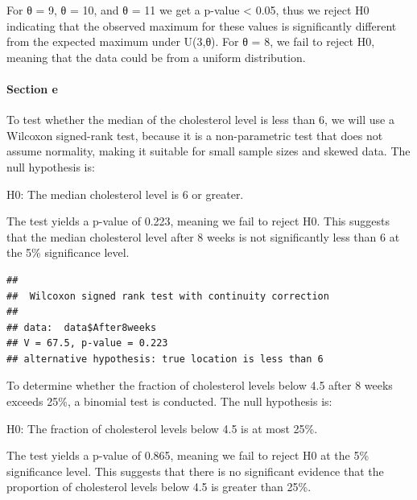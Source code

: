 \documentclass[
  11pt,
]{article}
\newenvironment{Shaded}{\begin{snugshade}}{\end{snugshade}}
\newcommand{\AttributeTok}[1]{\textcolor[rgb]{0.13,0.29,0.53}{#1}}
\newcommand{\ConstantTok}[1]{\textcolor[rgb]{0.56,0.35,0.01}{#1}}
\newcommand{\DecValTok}[1]{\textcolor[rgb]{0.00,0.00,0.81}{#1}}
\newcommand{\FunctionTok}[1]{\textcolor[rgb]{0.13,0.29,0.53}{\textbf{#1}}}
\newcommand{\NormalTok}[1]{#1}
\newcommand{\SpecialCharTok}[1]{\textcolor[rgb]{0.81,0.36,0.00}{\textbf{#1}}}
\newcommand{\StringTok}[1]{\textcolor[rgb]{0.31,0.60,0.02}{#1}}
\begin{document}
For θ = 9, θ = 10, and θ = 11 we get a p-value \textless{} 0.05, thus we
reject H0 indicating that the observed maximum for these values is
significantly different from the expected maximum under U(3,θ). For θ =
8, we fail to reject H0, meaning that the data could be from a uniform
distribution.

\paragraph{Section e}\label{section-e}

To test whether the median of the cholesterol level is less than 6, we
will use a Wilcoxon signed-rank test, because it is a non-parametric
test that does not assume normality, making it suitable for small sample
sizes and skewed data. The null hypothesis is:

H0: The median cholesterol level is 6 or greater.

The test yields a p-value of 0.223, meaning we fail to reject
H0\hspace{0pt}. This suggests that the median cholesterol level after 8
weeks is not significantly less than 6 at the 5\% significance level.

\begin{Shaded}
\end{Shaded}

\begin{verbatim}
## 
##  Wilcoxon signed rank test with continuity correction
## 
## data:  data$After8weeks
## V = 67.5, p-value = 0.223
## alternative hypothesis: true location is less than 6
\end{verbatim}

To determine whether the fraction of cholesterol levels below 4.5 after
8 weeks exceeds 25\%, a binomial test is conducted. The null hypothesis
is:

H0: The fraction of cholesterol levels below 4.5 is at most 25\%.

The test yields a p-value of 0.865, meaning we fail to reject
H0\hspace{0pt} at the 5\% significance level. This suggests that there
is no significant evidence that the proportion of cholesterol levels
below 4.5 is greater than 25\%.
\end{document}
